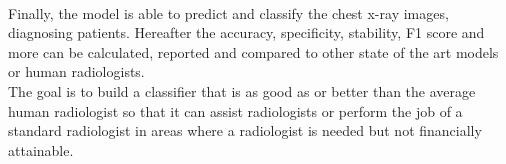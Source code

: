 \\
Finally, the model is able to predict and classify the chest x-ray images, diagnosing patients. Hereafter the accuracy, specificity, stability, F1 score and more can be calculated, reported and compared to other state of the art models or human radiologists.\newline
\\
The goal is to build a classifier that is as good as or better than the average human radiologist so that it can assist radiologists or perform the job of a standard radiologist in areas where a radiologist is needed but not financially attainable.

